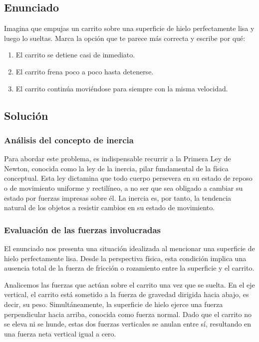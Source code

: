 \documentclass[12pt, a4paper]{article}
\begin{document}
\subsection*{Enunciado}
Imagina que empujas un carrito sobre una superficie de hielo perfectamente lisa y luego lo sueltas. Marca la opción que te parece más correcta y escribe por qué:
\begin{enumerate}
    \item[a)] El carrito se detiene casi de inmediato.
    \item[b)] El carrito frena poco a poco hasta detenerse.
    \item[c)] El carrito continúa moviéndose para siempre con la misma velocidad.
\end{enumerate}

\subsection*{Solución}

\subsubsection*{Análisis del concepto de inercia}
Para abordar este problema, es indispensable recurrir a la Primera Ley de Newton, conocida como la ley de la inercia, pilar fundamental de la física conceptual. Esta ley dictamina que todo cuerpo persevera en su estado de reposo o de movimiento uniforme y rectilíneo, a no ser que sea obligado a cambiar su estado por fuerzas impresas sobre él. La inercia es, por tanto, la tendencia natural de los objetos a resistir cambios en su estado de movimiento.

\subsubsection*{Evaluación de las fuerzas involucradas}
El enunciado nos presenta una situación idealizada al mencionar una superficie de hielo perfectamente lisa. Desde la perspectiva física, esta condición implica una ausencia total de la fuerza de fricción o rozamiento entre la superficie y el carrito. 

Analicemos las fuerzas que actúan sobre el carrito una vez que se suelta. En el eje vertical, el carrito está sometido a la fuerza de gravedad dirigida hacia abajo, es decir, su peso. Simultáneamente, la superficie de hielo ejerce una fuerza perpendicular hacia arriba, conocida como fuerza normal. Dado que el carrito no se eleva ni se hunde, estas dos fuerzas verticales se anulan entre sí, resultando en una fuerza neta vertical igual a cero.
\end{document}
